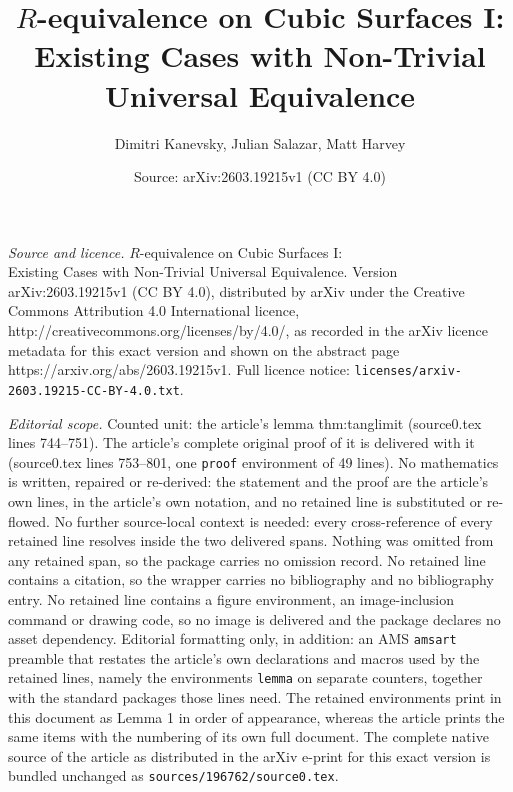\documentclass[10pt,a4paper]{amsart}
\title{$R$-equivalence on Cubic Surfaces I:\\ Existing Cases with Non-Trivial Universal Equivalence}
\author{Dimitri Kanevsky, Julian Salazar, Matt Harvey}
\date{Source: arXiv:2603.19215v1 (CC BY 4.0)}
\begin{document}
\maketitle

\noindent\emph{Source and licence.} $R$-equivalence on Cubic Surfaces I:\\ Existing Cases with Non-Trivial Universal Equivalence. Version arXiv:2603.19215v1 (CC BY 4.0), distributed by arXiv under the Creative Commons Attribution 4.0 International licence, http://creativecommons.org/licenses/by/4.0/, as recorded in the arXiv licence metadata for this exact version and shown on the abstract page https://arxiv.org/abs/2603.19215v1. Full licence notice: \texttt{licenses/arxiv-2603.19215-CC-BY-4.0.txt}.\par\smallskip

\noindent\textit{Editorial scope.} Counted unit: the article's lemma thm:tanglimit (source0.tex lines 744--751). The article's complete original proof of it is delivered with it (source0.tex lines 753--801, one \texttt{proof} environment of 49 lines). No mathematics is written, repaired or re-derived: the statement and the proof are the article's own lines, in the article's own notation, and no retained line is substituted or re-flowed.  No further source-local context is needed: every cross-reference of every retained line resolves inside the two delivered spans.  Nothing was omitted from any retained span, so the package carries no omission record.  No retained line contains a citation, so the wrapper carries no bibliography and no bibliography entry.  No retained line contains a figure environment, an image-inclusion command or drawing code, so no image is delivered and the package declares no asset dependency.  Editorial formatting only, in addition: an AMS \texttt{amsart} preamble that restates the article's own declarations and macros used by the retained lines, namely the environments \texttt{lemma} on separate counters, together with the standard packages those lines need.  The retained environments print in this document as Lemma 1 in order of appearance, whereas the article prints the same items with the numbering of its own full document.  The complete native source of the article as distributed in the arXiv e-print for this exact version is bundled unchanged as \texttt{sources/196762/source0.tex}.
\end{document}
